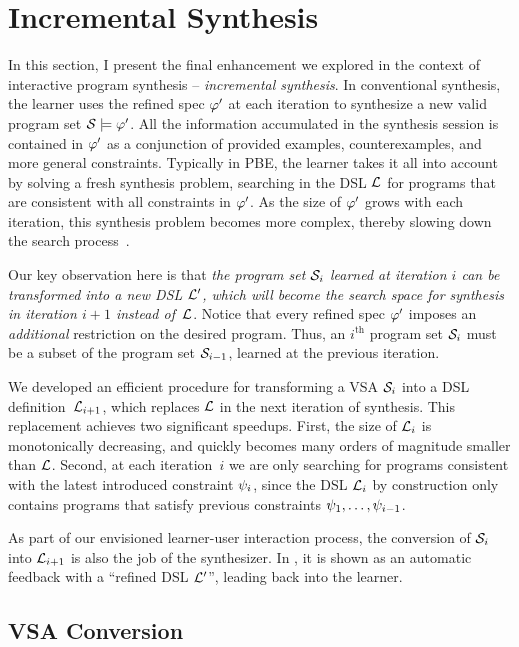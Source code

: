 \section{Incremental Synthesis}
\label{sec:interactive:incremental}

In this section, I present the final enhancement we explored in the context of interactive program synthesis --
\emph{incremental synthesis}.
In conventional synthesis, the learner uses the refined spec $\varphi'$ at each iteration to synthesize a new valid
program set $\mathcal{S} \models \varphi'$.
All the information accumulated in the synthesis session is contained in $\varphi'$ as a conjunction of provided examples,
counterexamples, and more general constraints.
Typically in PBE, the learner takes it all into account by solving a fresh synthesis problem, searching in the DSL
$\mathcal{L}$ for programs that are consistent with all constraints in $\varphi'$.
As the size of $\varphi'$ grows with each iteration, this synthesis problem becomes more complex, thereby slowing down the
search process~\cite{bitvectors}.

Our key observation here is that \emph{the program set $\mathcal{S}_i$ learned at iteration $i$ can be transformed into a new
    DSL $\mathcal{L}'$, which will become the search space for synthesis in iteration $i+1$ instead of~$\mathcal{L}$}.
Notice that every refined spec $\varphi'$ imposes an \emph{additional} restriction on the desired program.
Thus, an $i^{\text{th}}$ program set $\mathcal{S}_i$ must be a subset of the program set $\mathcal{S}_{i-1}$, learned at the previous
iteration.

We developed an efficient procedure for transforming a VSA $\mathcal{S}_i$ into a DSL definition~$\mathcal{L}_{i+1}$, which replaces
$\mathcal{L}$ in the next iteration of synthesis.
This replacement achieves two significant speedups.
First, the size of $\mathcal{L}_i$ is monotonically decreasing, and quickly becomes many orders of magnitude smaller than
$\mathcal{L}$.
Second, at each iteration~$i$ we are only searching for programs consistent with the latest introduced constraint
$\psi_i$, since the DSL $\mathcal{L}_i$ by construction only contains programs that satisfy previous constraints
$\psi_1, \dots, \psi_{i-1}$.

As part of our envisioned learner-user interaction process, the conversion of $\mathcal{S}_i$ into $\mathcal{L}_{i+1}$ is also the job
of the synthesizer.
In , it is shown as an automatic feedback with a ``refined DSL $\mathcal{L}'$'', leading back
into the learner.

\subsection{VSA Conversion}

